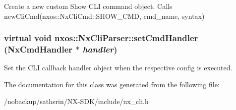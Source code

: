\label{classnxos_1_1NxCliParser_ac07fa22d7d83d4c9015ea1f3976163d8}
Create a new custom Show CLI command object. Calls newCliCmd(nxos::NxCliCmd::SHOW\_\-CMD, cmd\_\-name, syntax) \hypertarget{classnxos_1_1NxCliParser_a711e36619a40625ebf62b59693529d88}{
\subsubsection[{setCmdHandler}]{\setlength{\rightskip}{0pt plus 5cm}virtual void nxos::NxCliParser::setCmdHandler ({\bf NxCmdHandler} $\ast$ {\em handler})}}
\label{classnxos_1_1NxCliParser_a711e36619a40625ebf62b59693529d88}
Set the CLI callback handler object when the respective config is executed. 

The documentation for this class was generated from the following file:\begin{DoxyCompactItemize}
\item 
/nobackup/sathsrin/NX-\/SDK/include/nx\_\-cli.h\end{DoxyCompactItemize}
